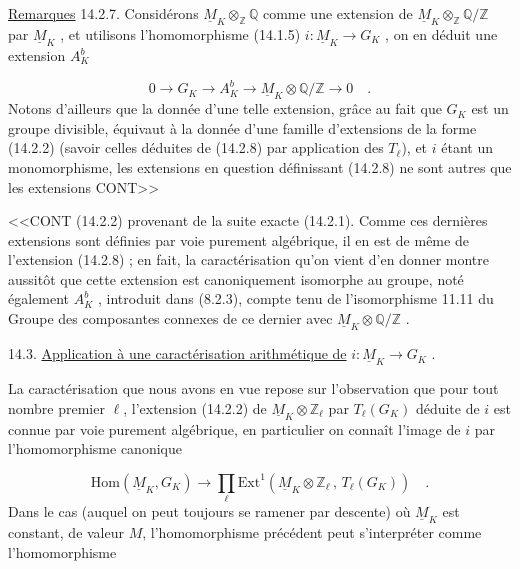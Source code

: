 \underline{Remarques} 14.2.7. Considérons $\underline{M}_K \otimes_{\mathbb{Z}} \mathbb{Q}$ comme une extension de $\underline{M}_K \otimes_{\mathbb{Z}} \mathbb{Q}/\mathbb{Z}$ par $\underline{M}_K$ , et utilisons l'homomorphisme (14.1.5) $i : \underline{M}_K \longrightarrow G_K$ , on en déduit une extension $A_K^b$

\begin{equation}\tag{14.2.8}
0 \longrightarrow G_K \longrightarrow A_K^b \longrightarrow \underline{M}_K \otimes \mathbb{Q}/\mathbb{Z} \longrightarrow 0 \quad .
\end{equation}
Notons d'ailleurs que la donnée d'une telle extension, grâce au fait que $G_K$ est un groupe divisible, équivaut à la donnée d'une famille d'extensions de la forme (14.2.2) (savoir celles déduites de (14.2.8) par application des $T_\ell$), et $i$ étant un monomorphisme, les extensions en question définissant (14.2.8) ne sont autres que les extensions CONT>>



<<CONT (14.2.2) provenant de la suite exacte (14.2.1). Comme ces dernières extensions sont définies par voie purement algébrique, il en est de même de l'extension (14.2.8) ; en fait, la caractérisation qu'on vient d'en donner montre aussitôt que cette extension est canoniquement isomorphe au groupe, noté également $A_K^b$ , introduit dans (8.2.3), compte tenu de l'isomorphisme 11.11 du Groupe des composantes connexes de ce dernier avec $\underline{M}_K \otimes \mathbb{Q}/\mathbb{Z}$ .


14.3. \underline{Application à une caractérisation arithmétique de} $i: \underline{M}_K \longrightarrow G_K$ .

La caractérisation que nous avons en vue repose sur l'observation que pour tout nombre premier $\ell$, l'extension (14.2.2) de $\underline{M}_K \otimes \mathbb{Z}_\ell$ par $T_\ell(G_K)$ déduite de $i$ est connue par voie purement algébrique, en particulier on connaît l'image de $i$ par l'homomorphisme canonique

\begin{equation}\tag{14.3.1}
\mathrm{Hom}(\underline{M}_K , G_K) \longrightarrow \prod_\ell \mathrm{Ext}^1(\underline{M}_K \otimes \mathbb{Z}_\ell \, , \, T_\ell(G_K)) \quad .
\end{equation}
Dans le cas (auquel on peut toujours se ramener par descente) où $\underline{M}_K$ est constant, de valeur $M$, l'homomorphisme précédent peut s'interpréter comme l'homomorphisme

